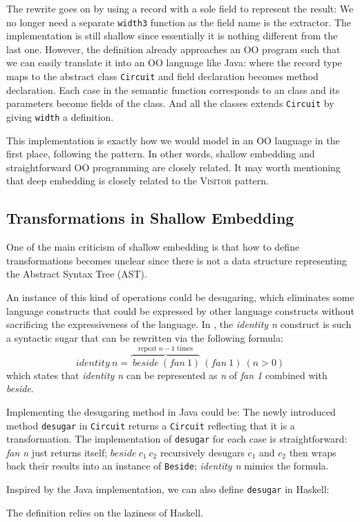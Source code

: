 The rewrite goes on by using a record with a sole field to represent the result:
We no longer need a separate \texttt{width3} function as the field name is the extractor.
The implementation is still shallow since essentially it is nothing different
from the last one.
However, the definition already approaches an OO program such that we can easily
translate it into an OO language like Java:
where the record type maps to the abstract class \texttt{Circuit} and field
declaration becomes method declaration.
Each case in the semantic function corresponds to an class and its parameters become fields of the class.
And all the classes extends \texttt{Circuit} by giving \texttt{width} a definition.

This implementation is exactly how we would model \dsl in an OO language in the first
place, following the \interp pattern.
In other words, shallow embedding and straightforward OO programming are closely
related.
It may worth mentioning that deep embedding is closely related to the \textsc{Visitor} pattern.

\subsection{Transformations in Shallow Embedding}
One of the main criticism of shallow embedding is that how to define transformations
becomes unclear since there is not a data structure representing the Abstract Syntax Tree (AST).

An instance of this kind of operations could be desugaring, which eliminates some
language constructs that could be expressed by other language constructs without
sacrificing the expressiveness of the language.
In \dsl, the \emph{identity n} construct is such a syntactic sugar that can
be rewritten via the following formula:
$$identity\ n = \overbrace{\ beside\ (fan\ 1)}^{\text{repeat }n-1\text{ times}}\ (fan\ 1)\ (n > 0)$$
which states that \emph{identity n} can be represented as \emph{n} of \emph{fan 1} combined with \emph{beside}.

Implementing the desugaring method in Java could be:
The newly introduced method \texttt{desugar} in \texttt{Circuit} returns a \texttt{Circuit} reflecting that it is a transformation. The implementation of \texttt{desugar} for each case is
straightforward: \emph{fan n} just returns itself; $beside\ c_1\ c_2$ recursively desugars $c_1$ and $c_2$ then wraps back
their results into an instance of \texttt{Beside}; \emph{identity n} mimics the
formula.

Inspired by the Java implementation, we can also define \texttt{desugar} in Haskell:

The definition relies on the laziness of Haskell.
